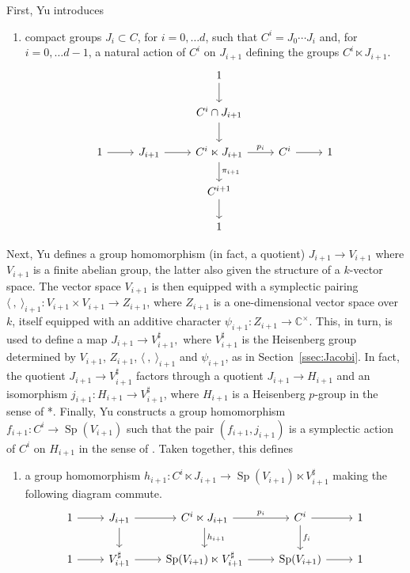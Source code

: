 \documentclass[10pt]{amsart}
\makeatletter
\theoremstyle{plain}
\theoremstyle{definition}
\newcommand{\CC}{{\mathbb{C}}}
\newcommand{\Fq}{k}
\newcommand{\labitem}[2]{
\def\@itemlabel{\textbf{#1}}
\item
\def\@currentlabel{#1}\label{#2}}
\newcommand{\Sp}{{\operatorname{Sp}}}
\makeatother
\begin{document}
First, Yu introduces 
\begin{enumerate}
\labitem{Y3}{Y3}
compact groups $J_i\subset C$, for $i=0, \ldots d$, such that 
$
C^i = J_0\cdots J_{i}
$ 
and, for $i=0, \ldots d-1$, a natural action of $C^i$ on $J_{i+1}$ defining the groups $C^i \ltimes J_{i+1}$.
\begin{equation}\label{eq:semiprod}
\begin{tikzcd}
\ && 1 \arrow{d} && \\
\ && C^{i}\cap J_{i+1}\arrow{d} && \\
1 \arrow{r} & J_{i+1} \arrow{r} & C^i \ltimes J_{i+1} \arrow{d}{\pi_{i+1}} \arrow{r}{p_i} & C^i \arrow{r} & 1\\
&& C^{i+1} \arrow{d}{} && \\
&& 1 &&
\end{tikzcd}
\end{equation}
\end{enumerate}
%
Next, Yu defines a group homomorphism (in fact, a quotient) 
$
J_{i+1} \to V_{i+1}
$
where $V_{i+1}$ is a finite abelian group, the latter also given the structure of a $\Fq$-vector space.
The vector space $V_{i+1}$ is then equipped with a symplectic pairing $\langle\ ,\ \rangle_{i+1} : V_{i+1}\times V_{i+1} \to Z_{i+1}$, where $Z_{i+1}$ is a one-dimensional vector space over $\Fq$, itself equipped with an additive character $\psi_{i+1} : Z_{i+1} \to \CC^\times$.
This, in turn, is used to define a map
$
J_{i+1} \to V_{i+1}^\sharp,
$
where $V_{i+1}^\sharp$ is the Heisenberg group determined by $V_{i+1}$, $Z_{i+1}$, $\langle\ ,\ \rangle_{i+1}$ and $\psi_{i+1}$, as in Section~\ref{ssec:Jacobi}.
In fact, the quotient $J_{i+1} \to V_{i+1}^\sharp$ factors through a quotient $J_{i+1} \to H_{i+1}$ and an isomorphism $j_{i+1} : H_{i+1} \to V_{i+1}^\sharp$, where $H_{i+1}$ is a Heisenberg $p$-group in the sense of \cite{yu:01a}*{}.
Finally, Yu constructs a group homomorphism $f_{i+1} : C^i \to \Sp(V_{i+1})$ such that the pair $(f_{i+1}, j_{i+1})$ is a symplectic action of $C^i$ on $H_{i+1}$ in the sense of \cite{yu:01a}.
%
Taken together, this defines
\begin{enumerate}
\labitem{Y4}{Y4}  a group homomorphism $h_{i+1} : C^i \ltimes J_{i+1} \to  \Sp(V_{i+1})\ltimes V_{i+1}^\sharp$ making the following diagram commute.
\[
\begin{tikzcd}
1 \arrow{r} & J_{i+1} \arrow{d} \arrow{r} & C^i \ltimes J_{i+1} \arrow{d}{h_{i+1}} \arrow{r}{p_i} & C^i \arrow{r} \arrow{d}{f_i} & 1\\ 
1 \arrow{r} & V_{i+1}^\sharp \arrow{r} & \Sp(V_{i+1}) \ltimes V_{i+1}^\sharp \arrow{r} & \Sp(V_{i+1}) \arrow{r} & 1
\end{tikzcd}
\]
\end{enumerate}
\end{document}
